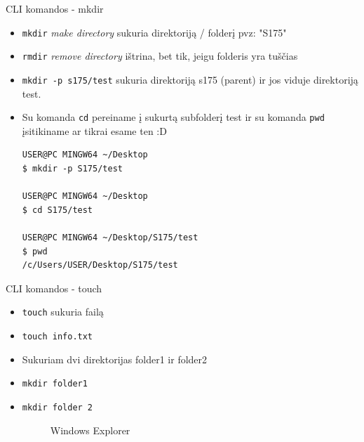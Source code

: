 \documentclass[11pt,xcolor=table]{beamer}
\begin{document}
\begin{frame}[fragile]{CLI komandos - mkdir}
\begin{itemize}
\item \colorbox{listinggray}{\lstinline|mkdir|}  \textit{make directory} sukuria direktoriją / folderį pvz: "S175"
\item \colorbox{listinggray}{\lstinline|rmdir|} \textit{remove directory} ištrina, bet tik, jeigu folderis yra tuščias
\item \colorbox{listinggray}{\lstinline|mkdir -p s175/test|} sukuria direktoriją s175 (parent) ir jos viduje direktoriją test. 
\item Su komanda \colorbox{listinggray}{\lstinline|cd|} pereiname į sukurtą subfolderį test ir su komanda \colorbox{listinggray}{\lstinline|pwd|} įsitikiname ar tikrai esame ten :D

\begin{lstlisting}
USER@PC MINGW64 ~/Desktop
$ mkdir -p S175/test

USER@PC MINGW64 ~/Desktop
$ cd S175/test

USER@PC MINGW64 ~/Desktop/S175/test
$ pwd
/c/Users/USER/Desktop/S175/test

\end{lstlisting}


\end{itemize}
\end{frame}
\begin{frame}{CLI komandos - touch}
\begin{itemize}
\item \colorbox{listinggray}{\lstinline|touch|} sukuria failą
\item \colorbox{listinggray}{\lstinline|touch info.txt|}
\item Sukuriam dvi direktorijas folder1 ir folder2
\item \colorbox{listinggray}{\lstinline|mkdir folder1|}
\item \colorbox{listinggray}{\lstinline|mkdir folder 2|}

\begin{figure}
\caption{Windows Explorer}
\end{figure}
\end{itemize}
\end{frame}
\end{document}
